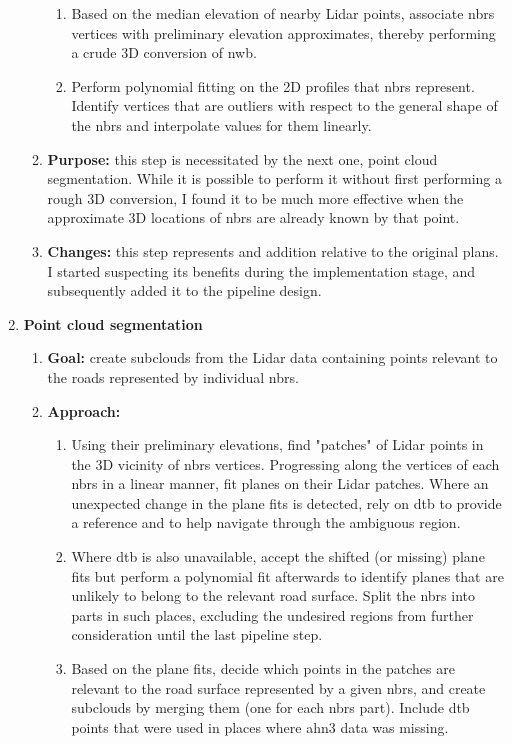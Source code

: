 \begin{enumerate}
\begin{enumerate}
\begin{enumerate}
            \item Based on the median elevation of nearby Lidar points, associate \ac{nbrs} vertices with preliminary elevation approximates, thereby performing a crude 3D conversion of \ac{nwb}.
            \item Perform polynomial fitting on the 2D profiles that \ac{nbrs} represent. Identify vertices that are outliers with respect to the general shape of the \ac{nbrs} and interpolate values for them linearly.
        \end{enumerate}
        \item \textbf{Purpose:} this step is necessitated by the next one, point cloud segmentation. While it is possible to perform it without first performing a rough 3D conversion, I found it to be much more effective when the approximate 3D locations of \ac{nbrs} are already known by that point.
        \item \textbf{Changes:} this step represents and addition relative to the original plans. I started suspecting its benefits during the implementation stage, and subsequently added it to the pipeline design.
    \end{enumerate}
    \item \textbf{Point cloud segmentation}
    \begin{enumerate}
        \item \textbf{Goal:} create subclouds from the Lidar data containing points relevant to the roads represented by individual \ac{nbrs}.
        \item \textbf{Approach:}
        \begin{enumerate}
            \item Using their preliminary elevations, find "patches" of Lidar points in the 3D vicinity of \ac{nbrs} vertices. Progressing along the vertices of each \ac{nbrs} in a linear manner, fit planes on their Lidar patches. Where an unexpected change in the plane fits is detected, rely on \ac{dtb} to provide a reference and to help navigate through the ambiguous region.
            \item Where \ac{dtb} is also unavailable, accept the shifted (or missing) plane fits but perform a polynomial fit afterwards to identify planes that are unlikely to belong to the relevant road surface. Split the \ac{nbrs} into parts in such places, excluding the undesired regions from further consideration until the last pipeline step. 
            \item Based on the plane fits, decide which points in the patches are relevant to the road surface represented by a given \ac{nbrs}, and create subclouds by merging them (one for each \ac{nbrs} part). Include \ac{dtb} points that were used in places where \ac{ahn3} data was missing.

\end{enumerate}
\end{enumerate}
\end{enumerate}
